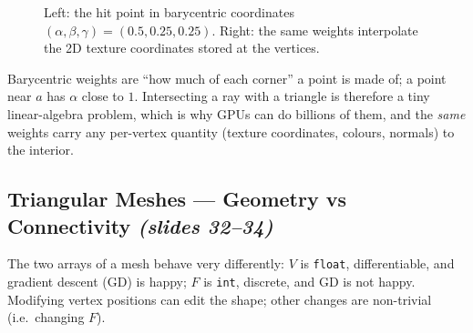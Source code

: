\documentclass[11pt,a4paper]{article}
\newcommand{\vo}{\bm{o}}
\newcommand{\vd}{\bm{d}}
\theoremstyle{definition}
\theoremstyle{plain}
\theoremstyle{remark}
\newcommand{\slides}[1]{\texorpdfstring{\emph{(#1)}}{(#1)}}
\begin{document}
\begin{figure}[ht]
\centering
{}
\caption{Left: the hit point in barycentric coordinates $(\alpha,\beta,\gamma)=(0.5,0.25,0.25)$. Right: the same weights interpolate the 2D texture coordinates stored at the vertices.}
\end{figure}

\begin{intuition}
Barycentric weights are ``how much of each corner'' a point is made of; a point near $a$ has $\alpha$ close to $1$. Intersecting a ray with a triangle is therefore a tiny linear-algebra problem, which is why GPUs can do billions of them, and the \emph{same} weights carry any per-vertex quantity (texture coordinates, colours, normals) to the interior.
\end{intuition}

\subsection{Triangular Meshes --- Geometry vs Connectivity \slides{slides 32--34}}
The two arrays of a mesh behave very differently:
$V$ is \texttt{float}, differentiable, and gradient descent (GD) is happy; $F$ is \texttt{int}, discrete, and GD is not happy. Modifying vertex positions can edit the shape; other changes are non-trivial (i.e.\ changing $F$).
\end{document}

